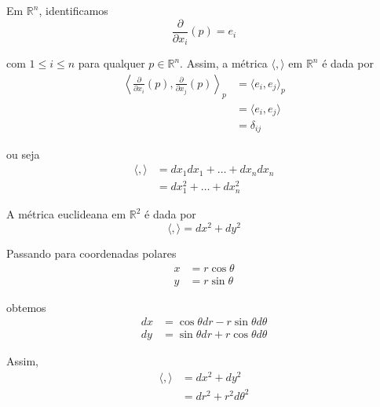 \begin{exemplo}
	Em $\mathbb{R}^n$, identificamos
	\begin{equation*}
		\frac{\partial}{\partial x_i} (p) = e_i
	\end{equation*}
	
	com $1 \leq i \leq n$ para qualquer $p \in \mathbb{R}^n$. Assim, a métrica $\langle , \rangle$ em $\mathbb{R}^n$ é dada por
	\begin{align*}
		\left\langle \frac{\partial}{\partial x_i}(p), \frac{\partial}{\partial x_j}(p) \right\rangle_p &= \langle e_i, e_j \rangle_p\\
		&= \langle e_i, e_j \rangle\\
		&= \delta_{ij}
	\end{align*}
	
	ou seja
	\begin{align*}
		\langle , \rangle &= dx_1 dx_1 + \ldots + dx_n dx_n \\
		&= dx_1^2 + \ldots + dx_n^2
	\end{align*}
\end{exemplo}


\begin{exemplo}
	A métrica euclideana em $\mathbb{R}^2$ é dada por
	\begin{equation*}
		\langle , \rangle = dx^2 + dy^2
	\end{equation*}
	
	Passando para coordenadas polares
	\begin{align*}
		x &= r \cos \theta\\
		y &= r \sin \theta
	\end{align*}
	
	obtemos
	\begin{align*}
		dx &= \cos \theta dr - r \sin \theta d\theta\\
		dy &= \sin \theta dr + r \cos \theta d\theta
	\end{align*}
	
	Assim,
	\begin{align*}
		\langle , \rangle &= dx^2 + dy^2\\
		&= dr^2 + r^2 d\theta^2
	\end{align*}
\end{exemplo}

